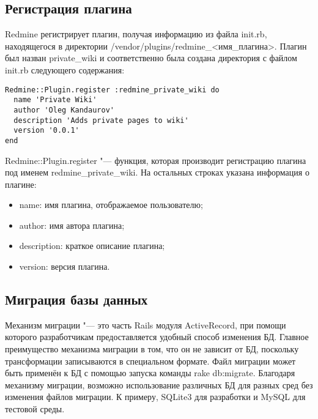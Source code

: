 \subsection{Регистрация плагина}
Redmine регистрирует плагин, получая информацию из файла init.rb, находящегося
в директории /vendor/plugins/redmine\_<имя\_плагина>. Плагин был назван
private\_wiki и соответственно была создана директория с файлом init.rb
следующего содержания:
\small{\begin{lstlisting}
Redmine::Plugin.register :redmine_private_wiki do
  name 'Private Wiki'
  author 'Oleg Kandaurov'
  description 'Adds private pages to wiki'
  version '0.0.1'
end
\end{lstlisting}}
Redmine::Plugin.register "--- функция, которая производит регистрацию плагина
под именем redmine\_private\_wiki. На остальных строках указана информация о
плагине:
\begin{itemize} 
  \item name: имя плагина, отображаемое пользователю;
  \item author: имя автора плагина;
  \item description: краткое описание плагина;
  \item version: версия плагина.
\end{itemize}

\subsection{Миграция базы данных} 
\label{section:migration}
Механизм миграции "--- это часть Rails модуля ActiveRecord, при помощи которого
разработчикам предоставляется удобный способ изменения БД. Главное преимущество
механизма миграции в том, что он не зависит от БД, поскольку трансформации
записываются в специальном формате. Файл миграции может быть применён к
БД с помощью запуска команды rake db:migrate. Благодаря механизму миграции,
возможно использование различных БД для разных сред без изменения файлов
миграции. К примеру, SQLite3 для разработки и MySQL для тестовой среды.

